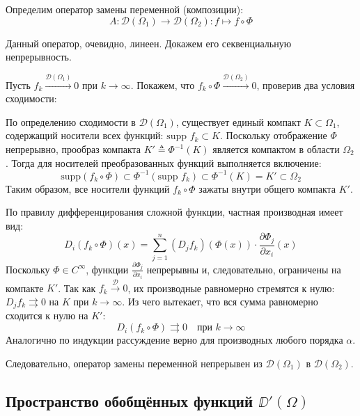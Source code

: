 \documentclass[12pt,a4paper]{article}
\begin{document}
Определим оператор замены переменной (композиции):
\[
A: \mathcal{D}(\Omega_1) \to \mathcal{D}(\Omega_2) : f \mapsto f \circ \Phi
\]

Данный оператор, очевидно, линеен. Докажем его секвенциальную непрерывность. 

Пусть \(f_k \xrightarrow{\mathcal{D}(\Omega_1)} 0\) при \(k \to \infty\). Покажем, что \(f_k \circ \Phi \xrightarrow{\mathcal{D}(\Omega_2)} 0\), проверив два условия сходимости:

По определению сходимости в \(\mathcal{D}(\Omega_1)\), существует единый компакт \(K \subset \Omega_1\), содержащий носители всех функций: \(\text{supp } f_k \subset K\). 
Поскольку отображение \(\Phi\) непрерывно, прообраз компакта \(K' \triangleq \Phi^{-1}(K)\) является компактом в области \(\Omega_2\). Тогда для носителей преобразованных функций выполняется включение:
\[
\text{supp}(f_k \circ \Phi) \subset \Phi^{-1}(\text{supp } f_k) \subset \Phi^{-1}(K) = K' \subset \Omega_2
\]
Таким образом, все носители функций \(f_k \circ \Phi\) зажаты внутри общего компакта \(K'\).

По правилу дифференцирования сложной функции, частная производная имеет вид:
\[
D_i(f_k \circ \Phi)(x) = \sum_{j=1}^n (D_j f_k)(\Phi(x)) \cdot \frac{\partial \Phi_j}{\partial x_i}(x)
\]
Поскольку \(\Phi \in C^\infty\), функции \(\frac{\partial \Phi_j}{\partial x_i}\) непрерывны и, следовательно, ограничены на компакте \(K'\). Так как \(f_k \xrightarrow{\mathcal{D}} 0\), их производные равномерно стремятся к нулю: \(D_j f_k \rightrightarrows 0\) на \(K\) при \(k \to \infty\). 
Из чего вытекает, что вся сумма равномерно сходится к нулю на \(K'\):
\[
D_i(f_k \circ \Phi) \rightrightarrows 0 \quad \text{при } k \to \infty
\]
Аналогично по индукции рассуждение верно для производных любого порядка \(\alpha\).

Следовательно, оператор замены переменной непрерывен из \(\mathcal{D}(\Omega_1)\) в \(\mathcal{D}(\Omega_2)\).




\subsection{Пространство обобщённых функций \texorpdfstring{\(\DD'(\Omega)\)}{D'(Omega)}}
\end{document}
